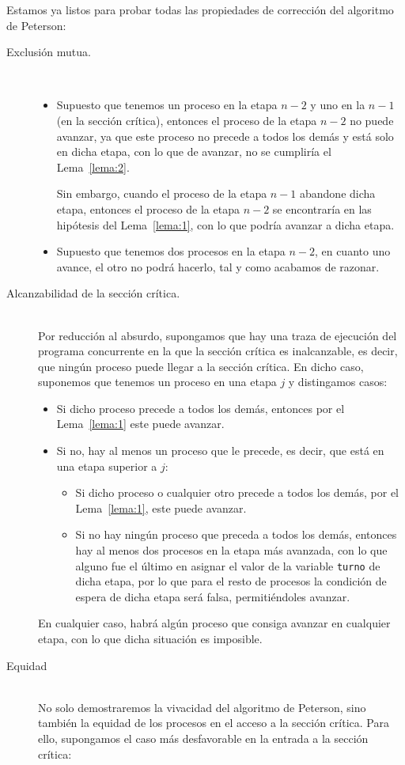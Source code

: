 Estamos ya listos para probar todas las propiedades de corrección del algoritmo de Peterson:
\begin{description}
    \item [Exclusión mutua.]~\\
        \begin{itemize}
            \item Supuesto que tenemos un proceso en la etapa $n-2$ y uno en la $n-1$ (en la sección crítica), entonces el proceso de la etapa $n-2$ no puede avanzar, ya que este proceso no precede a todos los demás y está solo en dicha etapa, con lo que de avanzar, no se cumpliría el Lema~\ref{lema:2}.

                Sin embargo, cuando el proceso de la etapa $n-1$ abandone dicha etapa, entonces el proceso de la etapa $n-2$ se encontraría en las hipótesis del Lema~\ref{lema:1}, con lo que podría avanzar a dicha etapa.
            \item Supuesto que tenemos dos procesos en la etapa $n-2$, en cuanto uno avance, el otro no podrá hacerlo, tal y como acabamos de razonar.
        \end{itemize}
    \item [Alcanzabilidad de la sección crítica.]~\\
        Por reducción al absurdo, supongamos que hay una traza de ejecución del programa concurrente en la que la sección crítica es inalcanzable, es decir, que ningún proceso puede llegar a la sección crítica. En dicho caso, suponemos que tenemos un proceso en una etapa $j$ y distingamos casos:
        \begin{itemize}
            \item Si dicho proceso precede a todos los demás, entonces por el Lema~\ref{lema:1} este puede avanzar.
            \item Si no, hay al menos un proceso que le precede, es decir, que está en una etapa superior a $j$:
                \begin{itemize}
                    \item Si dicho proceso o cualquier otro precede a todos los demás, por el Lema~\ref{lema:1}, este puede avanzar.
                    \item Si no hay ningún proceso que preceda a todos los demás, entonces hay al menos dos procesos en la etapa más avanzada, con lo que alguno fue el último en asignar el valor de la variable \verb|turno| de dicha etapa, por lo que para el resto de procesos la condición de espera de dicha etapa será falsa, permitiéndoles avanzar.
                \end{itemize}
        \end{itemize}
        En cualquier caso, habrá algún proceso que consiga avanzar en cualquier etapa, con lo que dicha situación es imposible.
    \item [Equidad]~\\
        No solo demostraremos la vivacidad del algoritmo de Peterson, sino también la equidad de los procesos en el acceso a la sección crítica. Para ello, supongamos el caso más desfavorable en la entrada a la sección crítica:


\end{description}
